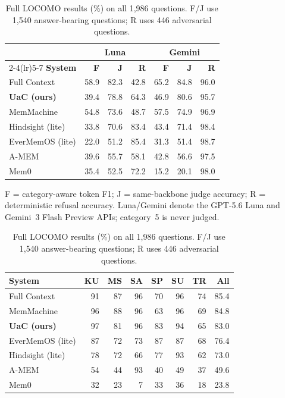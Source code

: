 \documentclass[letterpaper]{article} %
\begin{document}
\begin{table}[t]
\begin{minipage}[t]{0.52\textwidth}
\centering
{%
\footnotesize
\setlength{\tabcolsep}{2pt}
\begin{tabular}{@{}lrrrrrr@{}}
\toprule
 & \multicolumn{3}{c}{\textbf{Luna}} & \multicolumn{3}{c}{\textbf{Gemini}} \\
\cmidrule(lr){2-4}\cmidrule(lr){5-7}
\textbf{System} & \textbf{F} & \textbf{J} & \textbf{R} & \textbf{F} & \textbf{J} & \textbf{R} \\
\midrule
Full Context       & 58.9 & 82.3 & 42.8 & 65.2 & 84.8 & 96.0 \\
\textbf{UaC (ours)} & 39.4 & 78.8 & 64.3 & 46.9 & 80.6 & 95.7 \\
MemMachine         & 54.8 & 73.6 & 48.7 & 57.5 & 74.9 & 96.9 \\
Hindsight (lite)   & 33.8 & 70.6 & 83.4 & 43.4 & 71.4 & 98.4 \\
EverMemOS (lite)   & 22.0 & 51.2 & 85.4 & 31.3 & 51.4 & 98.7 \\
A-MEM              & 39.6 & 55.7 & 58.1 & 42.8 & 56.6 & 97.5 \\
Mem0               & 35.4 & 52.5 & 72.2 & 15.2 & 20.1 & 98.0 \\
\bottomrule
\end{tabular}

\vspace{2pt}
\raggedright F = category-aware token F1; J = same-backbone judge accuracy; R = deterministic refusal accuracy. Luna/Gemini denote the GPT-5.6 Luna and Gemini~3 Flash Preview APIs; category~5 is never judged.\par
}
\caption{Full LOCOMO results (\%) on all 1{,}986 questions. F/J use 1{,}540 answer-bearing questions; R uses 446 adversarial questions.}
\label{tab:locomo}
\end{minipage}
\hfill
\begin{minipage}[t]{0.46\textwidth}
\centering
{%
\footnotesize
\setlength{\tabcolsep}{1.5pt}
\begin{tabular}{@{}lrrrrrrr@{}}
\toprule
\textbf{System} & \textbf{KU} & \textbf{MS} & \textbf{SA} & \textbf{SP} & \textbf{SU} & \textbf{TR} & \textbf{All} \\
\midrule
Full Context     & 91 & 87 & 96 & 70 & 96 & 74 & 85.4 \\
MemMachine       & 96 & 88 & 96 & 63 & 96 & 69 & 84.8 \\
\textbf{UaC (ours)} & 97 & 81 & 96 & 83 & 94 & 65 & 83.0 \\
EverMemOS (lite) & 87 & 72 & 73 & 87 & 87 & 68 & 76.4 \\
Hindsight (lite) & 78 & 72 & 66 & 77 & 93 & 62 & 73.0 \\
A-MEM            & 54 & 44 & 93 & 40 & 49 & 37 & 49.6 \\
Mem0             & 32 & 23 &  7 & 33 & 36 & 18 & 23.8 \\
\bottomrule
\end{tabular}

}
\end{minipage}
\end{table}
\end{document}
